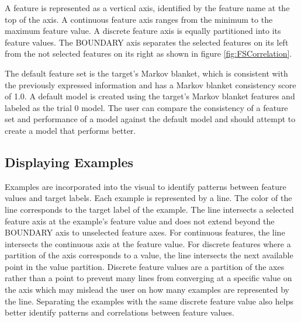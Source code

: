 A feature is represented as a vertical axis, identified by the feature name at the top of the axis. A continuous feature axis ranges from the minimum to the maximum feature value. A discrete feature axis is equally partitioned into its feature values. The BOUNDARY axis separates the selected features on its left from the not selected features on its right as shown in figure \ref{fig:FSCorrelation}. 

The default feature set is the target's Markov blanket, which is consistent with the previously expressed information and has a Markov blanket consistency score of 1.0. A default model is created using the target's Markov blanket features and labeled as the trial 0 model. The user can compare the consistency of a feature set and performance of a model against the default model and should attempt to create a model that performs better. 

\subsection{Displaying Examples}
Examples are incorporated into the visual to identify patterns between feature values and target labels. Each example is represented by a line. The color of the line corresponds to the target label of the example. The line intersects a selected feature axis at the example's feature value and does not extend beyond the BOUNDARY axis to unselected feature axes. For continuous features, the line intersects the continuous axis at the feature value. For discrete features where a partition of the axis corresponds to a value, the line intersects the next available point in the value partition. Discrete feature values are a partition of the axes rather than a point to prevent many lines from converging at a specific value on the axis which may mislead the user on how many examples are represented by the line. Separating the examples with the same discrete feature value also helps better identify patterns and correlations between feature values. 

